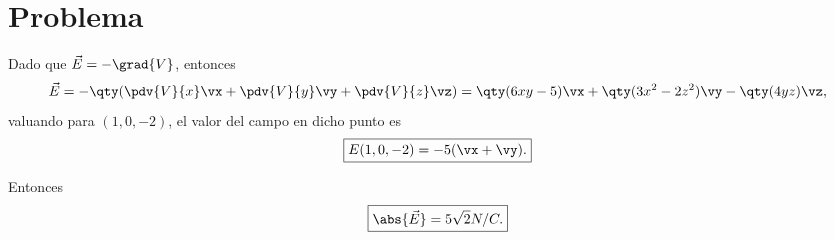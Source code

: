 \section*{Problema}

Dado que $\vec{E} = -\grad{V}$, entonces
	$$ \vec{E} = -\qty(\pdv{V}{x} \vx + \pdv{V}{y} \vy + \pdv{V}{z} \vz) = \qty(6xy - 5) \vx + \qty(3x^2 - 2z^2) \vy - \qty(4yz) \vz , $$
valuando para $(1,0,-2)$, el valor del campo en dicho punto es
	$$ \boxed{ E(1,0,-2) = -5(\vx + \vy). } $$
	
Entonces
	$$ \boxed{ \abs{\vec{E}} = 5\sqrt{2} N/C .} $$










